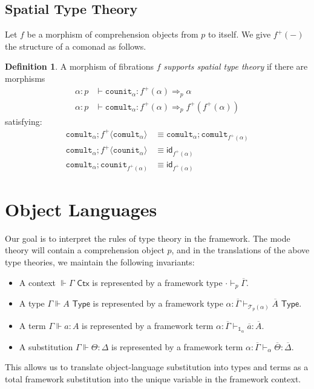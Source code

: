 \documentclass[10pt]{article}
\theoremstyle{definition}
\newtheorem{definition}{Definition}
\newcommand{\yields}{\vdash}
\newcommand{\CTX}{\,\,\mathsf{Ctx}}
\newcommand{\TYPE}{\,\,\mathsf{Type}}
\newcommand{\id}{\mathsf{id}}
\newcommand\TrPlus[2]{\ensuremath{{#1}^+(#2)}}
\newcommand\El[2]{\mathcal{T}_{#1}(#2)}
\newcommand\ApPlus[2]{\ensuremath{{#1}^+ \langle #2 \rangle }}
\newcommand{\qyields}{\Vdash}
\newcommand{\upstairs}[1]{\overline{#1}}
\newcommand\One{\ensuremath{\mathds{1}}}
\newcommand\fcomult[1]{\ensuremath{\mathtt{comult}_{#1}}}
\newcommand\fcounit[1]{\ensuremath{\mathtt{counit}_{#1}}}
\begin{document}
\subsection{Spatial Type Theory}

Let $f$ be a morphism of comprehension objects from $p$ to itself. We give $\TrPlus{f}{-}$ the structure of a comonad as follows.
\begin{definition}\label{def:supports-spatial}
A morphism of fibrations $f$ \emph{supports spatial type theory} if  there are morphisms
\begin{align*}
\alpha : p &\yields \fcounit{\alpha} : \TrPlus{f}{\alpha} \Rightarrow_p \alpha \\
\alpha : p &\yields \fcomult{\alpha} : \TrPlus{f}{\alpha} \Rightarrow_p \TrPlus{f}{\TrPlus{f}{\alpha}}
\end{align*}
satisfying:
\begin{align}
\fcomult{\alpha};\ApPlus{f}{\fcomult{\alpha}} &\equiv \fcomult{\alpha};\fcomult{\TrPlus{f}{\alpha}} \\
\fcomult{\alpha};\ApPlus{f}{\fcounit{\alpha}} &\equiv \id_{\TrPlus{f}{\alpha}} \\
\fcomult{\alpha};\fcounit{\TrPlus{f}{\alpha}} &\equiv \id_{\TrPlus{f}{\alpha}}
\end{align}
\end{definition}


\section{Object Languages}

Our goal is to interpret the rules of type theory in the framework. The mode theory will contain a comprehension object $p$, and in the translations of the above type theories, we maintain the following invariants:

\begin{itemize}
\item A context $\qyields \Gamma \CTX$ is represented by a framework type $\cdot \yields_p \upstairs{\Gamma}$.
\item A type $\Gamma \qyields A \TYPE$ is represented by a framework type $\alpha : \upstairs{\Gamma} \yields_{\El{p}{\alpha}} \upstairs{A} \TYPE$.
\item A term $\Gamma \qyields a : A$ is represented by a framework term $\alpha : \upstairs{\Gamma} \yields_{\One_\alpha} \upstairs{a} : \upstairs{A}$.
\item A substitution $\Gamma \qyields \Theta : \Delta$ is represented by a framework term $\alpha : \upstairs{\Gamma} \yields_\alpha \upstairs{\Theta} : \upstairs{\Delta}$.
\end{itemize}
This allows us to translate object-language substitution into types and terms as a total framework substitution into the unique variable in the framework context.
\end{document}
